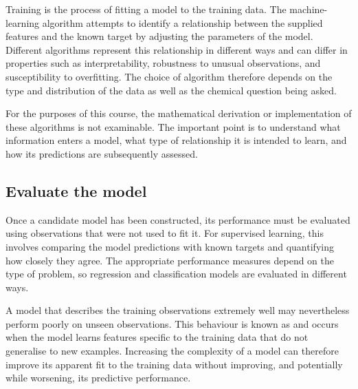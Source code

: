 Training is the process of fitting a model to the training data.
The machine-learning algorithm attempts to identify a relationship between the supplied features and the known target by adjusting the parameters of the model.
Different algorithms represent this relationship in different ways and can differ in properties such as interpretability, robustness to unusual observations, and susceptibility to overfitting.
The choice of algorithm therefore depends on the type and distribution of the data as well as the chemical question being asked.

For the purposes of this course, the mathematical derivation or implementation of these algorithms is not examinable.
The important point is to understand what information enters a model, what type of relationship it is intended to learn, and how its predictions are subsequently assessed.

\subsection{Evaluate the model}

Once a candidate model has been constructed, its performance must be evaluated using observations that were not used to fit it.
For supervised learning, this involves comparing the model predictions with known targets and quantifying how closely they agree.
The appropriate performance measures depend on the type of problem, so regression and classification models are evaluated in different ways.

A model that describes the training observations extremely well may nevertheless perform poorly on unseen observations.
This behaviour is known as  and occurs when the model learns features specific to the training data that do not generalise to new examples.
Increasing the complexity of a model can therefore improve its apparent fit to the training data without improving, and potentially while worsening, its predictive performance.

